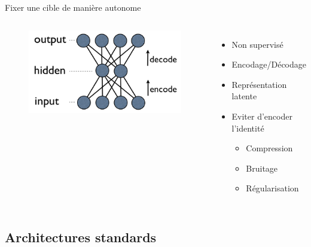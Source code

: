 \documentclass{beamer}
\begin{document}
\begin{frame}{Fixer une cible  de manière autonome}

  \begin{columns}
    \begin{figure}
      \centering
      \includegraphics[scale=0.8]{../Figures/DenseAuto}
    \end{figure}

    \begin{itemize}
    \item Non supervisé
    \item Encodage/Décodage
    \item Représentation latente
    \item Eviter d'encoder l'identité\pause
      \begin{itemize}
      \item Compression\pause
      \item Bruitage\pause
      \item Régularisation
      \end{itemize}
    \end{itemize}
  \end{columns}
\end{frame}

\subsection{Architectures standards}
\end{document}
